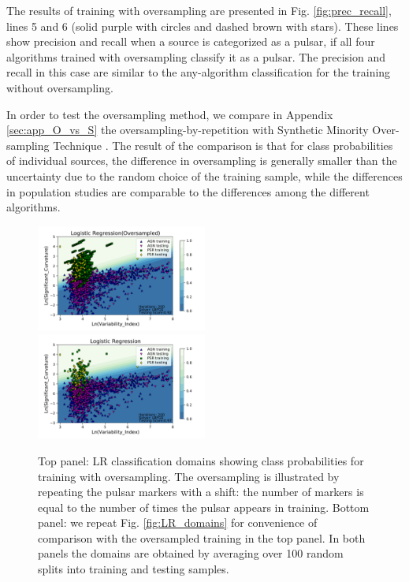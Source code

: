 The results of training with oversampling are presented  in Fig. \ref{fig:prec_recall},
lines 5 and 6 (solid purple with circles and dashed brown with stars). 
These lines show precision and recall when a source is categorized as a pulsar, if all four algorithms trained with oversampling classify it as a pulsar. The precision and recall in this case are similar to the any-algorithm classification for the training without oversampling.

In order to test the oversampling method, we compare in Appendix \ref{sec:app_O_vs_S} the oversampling-by-repetition with Synthetic Minority Over-sampling Technique \cite[SMOTE,][]{Chawla_2002}. The result of the comparison is that for class probabilities of individual sources, the difference in oversampling is generally smaller than the uncertainty due to the random choice of the training sample, while the differences in population studies are comparable to the differences among the different algorithms.


\begin{figure}[h]
\centering
\includegraphics[width=0.5\textwidth]{plots/classification_domains/lr_200_lbfgs_oversample.pdf} \\
\includegraphics[width=0.5\textwidth]{plots/classification_domains/lr_200_lbfgs.pdf}
\caption{Top panel: LR classification domains showing class probabilities for training with oversampling.
The oversampling is illustrated by repeating the pulsar markers with a shift: the number of markers is equal to the number of times the pulsar appears in training.
Bottom panel: we repeat Fig. \ref{fig:LR_domains} for convenience of comparison with the oversampled training in the top panel.
In both panels the domains are obtained by averaging over 100 random splits into training and testing samples.
}  
\label{fig:LR_domains_O}
\end{figure}
